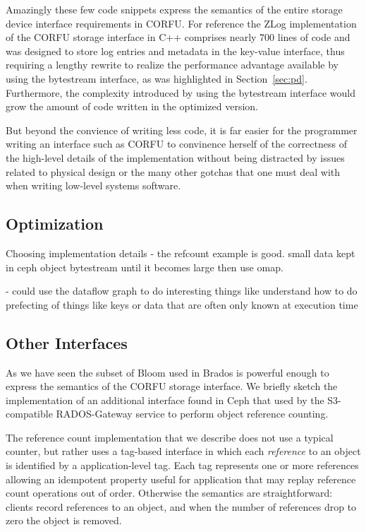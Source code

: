 \documentclass[10pt,twocolumn]{article}
\begin{document}
Amazingly these few code snippets express the semantics of the entire storage
device interface requirements in CORFU. For reference the ZLog implementation
of the CORFU storage interface in C++ comprises nearly 700 lines of code and
was designed to store log entries and metadata in the key-value interface,
thus requiring a lengthy rewrite to realize the performance advantage
available by using the bytestream interface, as was highlighted in
Section~\ref{sec:pd}. Furthermore, the complexity introduced by using the
bytestream interface would grow the amount of code written in the optimized
version.

But beyond the convience of writing less code, it is far easier for the
programmer writing an interface such as CORFU to convinence herself of the
correctness of the high-level details of the implementation without being
distracted by issues related to physical design or the many other gotchas that
one must deal with when writing low-level systems software.

\subsection{Optimization}

Choosing implementation details
  - the refcount example is good. small data kept in ceph object bytestream
until it becomes large then use omap.

  - could use the dataflow graph to do interesting things like understand how
  to do prefecting of things like keys or data that are often only known at
  execution time

\subsection{Other Interfaces}

As we have seen the subset of Bloom used in Brados is powerful enough to
express the semantics of the CORFU storage interface. We briefly sketch the
implementation of an additional interface found in Ceph that used by the
S3-compatible RADOS-Gateway service to perform object reference counting.

The reference count implementation that we describe does not use a typical
counter, but rather uses a tag-based interface in which each \emph{reference}
to an object is identified by a application-level tag. Each tag represents
one or more references allowing an idempotent property useful for application
that may replay reference count operations out of order. Otherwise the
semantics are straightforward: clients record references to an object, and
when the number of references drop to zero the object is removed.
\end{document}
